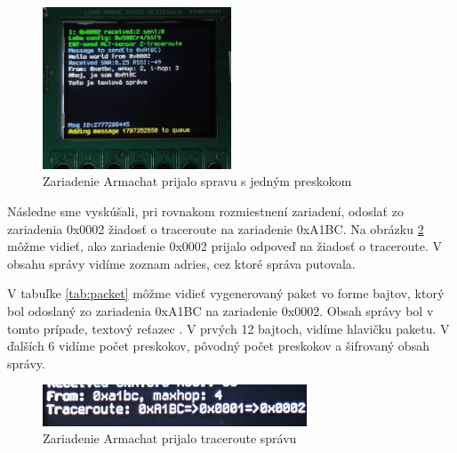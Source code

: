 \documentclass[slovak,master]{diploma}
\begin{document}
\begin{figure}
	\centering
	\includegraphics[width=0.5\textwidth]{Figures/armRec2.jpg}
	\caption{Zariadenie Armachat prijalo spravu s jedným preskokom}
	\label{fig:armRec2}
\end{figure}

Následne sme vyskúšali, pri rovnakom rozmiestnení zariadení, odoslať zo zariadenia 0x0002 žiadosť o traceroute na zariadenie 0xA1BC. Na obrázku \ref{fig:armTraceroute} môžme 
vidieť, ako zariadenie 0x0002 prijalo odpoveď na žiadosť o traceroute. V obsahu správy vidíme zoznam adries, cez ktoré správa putovala.

V tabuľke \ref{tab:packet} môžme vidieť vygenerovaný paket vo forme bajtov, ktorý bol odoslaný zo zariadenia 0xA1BC na zariadenie 0x0002. Obsah správy bol v tomto prípade, 
textový reťazec . V prvých 12 bajtoch, vidíme hlavičku paketu. V ďalších 6 vidíme počet preskokov, pôvodný počet preskokov a šifrovaný obsah správy.

\begin{figure}[!h]
	\centering
	\includegraphics[width=0.7\textwidth]{Figures/armTraceroute.jpg}
	\caption{Zariadenie Armachat prijalo traceroute správu}
	\label{fig:armTraceroute}
\end{figure}
\end{document}
